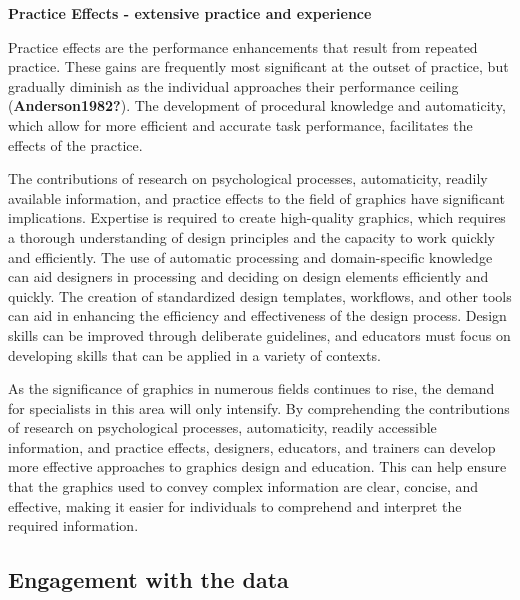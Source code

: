 \documentclass[print]{nuthesis}
\begin{document}
\textbf{Practice Effects - extensive practice and experience}

Practice effects are the performance enhancements that result from repeated practice.
These gains are frequently most significant at the outset of practice, but gradually diminish as the individual approaches their performance ceiling (\textbf{Anderson1982?}).
The development of procedural knowledge and automaticity, which allow for more efficient and accurate task performance, facilitates the effects of the practice.

The contributions of research on psychological processes, automaticity, readily available information, and practice effects to the field of graphics have significant implications.
Expertise is required to create high-quality graphics, which requires a thorough understanding of design principles and the capacity to work quickly and efficiently.
The use of automatic processing and domain-specific knowledge can aid designers in processing and deciding on design elements efficiently and quickly.
The creation of standardized design templates, workflows, and other tools can aid in enhancing the efficiency and effectiveness of the design process.
Design skills can be improved through deliberate guidelines, and educators must focus on developing skills that can be applied in a variety of contexts.

As the significance of graphics in numerous fields continues to rise, the demand for specialists in this area will only intensify.
By comprehending the contributions of research on psychological processes, automaticity, readily accessible information, and practice effects, designers, educators, and trainers can develop more effective approaches to graphics design and education.
This can help ensure that the graphics used to convey complex information are clear, concise, and effective, making it easier for individuals to comprehend and interpret the required information.

\hypertarget{engagement-with-the-data}{%
\subsection{Engagement with the data}\label{engagement-with-the-data}}

\end{document}
